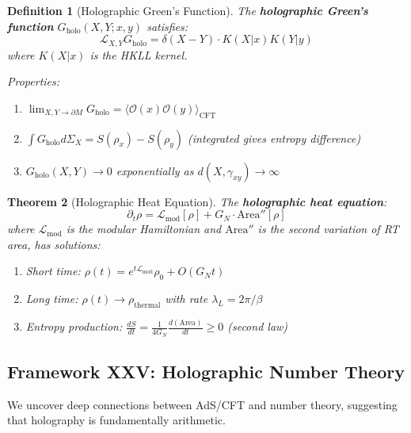 \documentclass[12pt,a4paper]{article}
\newtheorem{theorem}{Theorem}[section]
\newtheorem{definition}[theorem]{Definition}
\begin{document}
\begin{definition}[Holographic Green's Function]\label{def:holo-green}
The \textbf{holographic Green's function} $G_{\text{holo}}(X, Y; x, y)$ satisfies:
\begin{equation}
\mathcal{L}_{X,Y} G_{\text{holo}} = \delta(X-Y) \cdot K(X|x) K(Y|y)
\end{equation}
where $K(X|x)$ is the HKLL kernel.

Properties:
\begin{enumerate}
    \item $\lim_{X,Y \to \partial M} G_{\text{holo}} = \langle \mathcal{O}(x) \mathcal{O}(y) \rangle_{\text{CFT}}$
    \item $\int G_{\text{holo}} d\Sigma_X = S(\rho_{x}) - S(\rho_y)$ (integrated gives entropy difference)
    \item $G_{\text{holo}}(X, Y) \to 0$ exponentially as $d(X, \gamma_{xy}) \to \infty$
\end{enumerate}
\end{definition}

\begin{theorem}[Holographic Heat Equation]\label{thm:holo-heat}
The \textbf{holographic heat equation}:
\begin{equation}
\partial_t \rho = \mathcal{L}_{\text{mod}}[\rho] + G_N \cdot \text{Area}''[\rho]
\end{equation}
where $\mathcal{L}_{\text{mod}}$ is the modular Hamiltonian and $\text{Area}''$ is the second variation of RT area, has solutions:
\begin{enumerate}
    \item Short time: $\rho(t) = e^{t\mathcal{L}_{\text{mod}}} \rho_0 + O(G_N t)$
    \item Long time: $\rho(t) \to \rho_{\text{thermal}}$ with rate $\lambda_L = 2\pi/\beta$
    \item Entropy production: $\frac{dS}{dt} = \frac{1}{4G_N} \frac{d(\text{Area})}{dt} \geq 0$ (second law)
\end{enumerate}
\end{theorem}

\subsection{Framework XXV: Holographic Number Theory}

We uncover deep connections between AdS/CFT and number theory, suggesting that holography is fundamentally arithmetic.
\end{document}
